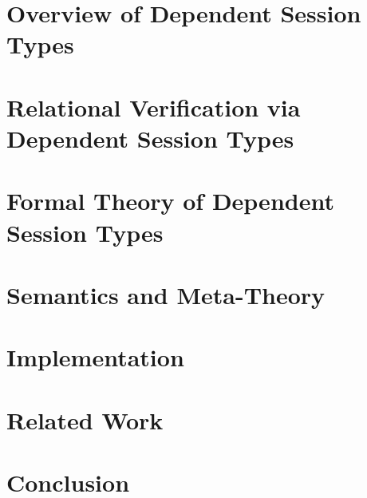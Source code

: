 \documentclass[acmsmall,10pt,anonymous]{acmart}
\begin{document}
\section{Overview of Dependent Session Types}\label{sec:overview}


\section{Relational Verification via Dependent Session Types}\label{sec:relational}


\section{Formal Theory of Dependent Session Types}\label{sec:theory}


\section{Semantics and Meta-Theory}\label{sec:semantics}


\section{Implementation}\label{sec:implementation}
\section{Related Work}\label{sec:related}
\section{Conclusion}\label{sec:conclusion}


\end{document}
